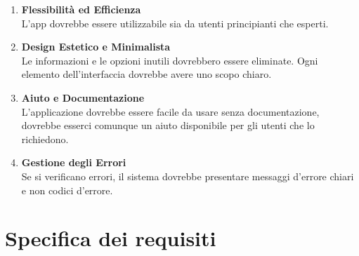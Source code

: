 \begin{enumerate}
	\item \textbf{\sffamily Flessibilità ed Efficienza} \\
	      L'app dovrebbe essere utilizzabile sia da utenti principianti che esperti.

	\item \textbf{\sffamily Design Estetico e Minimalista} \\
	      Le informazioni e le opzioni inutili dovrebbero essere eliminate.
	      Ogni elemento dell'interfaccia dovrebbe avere uno scopo chiaro.

	\item \textbf{\sffamily Aiuto e Documentazione} \\
	      L'applicazione dovrebbe essere facile da usare senza documentazione, dovrebbe esserci comunque un aiuto disponibile per gli utenti che lo richiedono.

	\item \textbf{\sffamily Gestione degli Errori} \\
	      Se si verificano errori, il sistema dovrebbe presentare messaggi d'errore chiari e non codici d'errore.
\end{enumerate}

\section{Specifica dei requisiti}